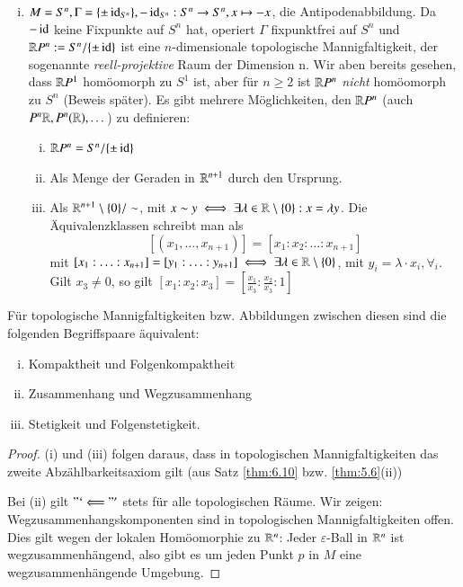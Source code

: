 \documentclass[a4paper,10pt]{scrartcl}
\newcommand{\eps}{\varepsilon}
\begin{document}
\begin{exs*}
 \begin{enumerate}[(i)]
  \item $M=S^n, \Gamma=\{\pm \operatorname{id}_{S^n}\}, -\operatorname{id}_{S^n}: S^n\to S^n, x\mapsto -x$, die Antipodenabbildung. Da $-\operatorname{id}$ keine Fixpunkte 
auf $S^n$ hat, operiert $\Gamma$ fixpunktfrei auf $S^n$ und $\mathbb{R} P^n := S^n/\{\pm \operatorname{id}\}$ ist eine $n$-dimensionale topologische Mannigfaltigkeit,
 der sogenannte \emph{reell-projektive} Raum der Dimension n. Wir aben bereits gesehen, dass $\mathbb{R} P^1$ homöomorph zu $S^1$ ist, aber für $n \geq 2$ ist $\mathbb{R} P^n$ \emph{nicht} homöomorph zu $S^n$ (Beweis später). Es gibt mehrere Möglichkeiten, den $\mathbb{R} P^n$ (auch $P^n \mathbb{R}, P^n(\mathbb{R}), \dotsc$) zu definieren:
\begin{enumerate}[(i)]
\item $\mathbb{R} P^n=S^n/\{\pm\operatorname{id}\}$ 
\item Als Menge der Geraden in $\mathbb{R}^{n+1}$ durch den Ursprung.
\item Als $\mathbb{R}^{n+1}\setminus \{0\}/\sim$, mit $x\sim y \iff \exists \lambda\in \mathbb{R}\setminus\{0\}: x=\lambda y$. Die Äquivalenzklassen schreibt man als 
\[
[(x_1,\dotsc,x_{n+1})]=[x_1:x_2:\dotsc: x_{n+1}] 
\]
mit $[x_1:\dotsc:x_{n+1}]=[y_1:\dotsc:y_{n+1}]\iff \exists \lambda\in \mathbb{R}\setminus\{0\}$, mit $y_i=\lambda\cdot x_i, \forall_i$.
Gilt $x_3\neq 0$, so gilt $[x_1:x_2:x_3]=[\frac{x_1}{x_3}:\frac{x_2}{x_3}:1]$\\
\fixme[fig34]
\end{enumerate}  
\end{enumerate}
\end{exs*}
\begin{st}
 Für topologische Mannigfaltigkeiten bzw. Abbildungen zwischen diesen sind die folgenden Begriffspaare äquivalent:
\begin{enumerate}[(i)]
 \item Kompaktheit und Folgenkompaktheit
 \item Zusammenhang und Wegzusammenhang
 \item Stetigkeit und Folgenstetigkeit.
\end{enumerate}
\end{st}
\fixme[fig35]
\begin{proof}
 (i) und (iii) folgen daraus, dass in topologischen Mannigfaltigkeiten das zweite Abzählbarkeitsaxiom gilt (aus Satz \ref{thm:6.10} bzw. \ref{thm:5.6}(ii))

Bei (ii) gilt $"`\Longleftarrow"'$ stets für alle topologischen Räume. Wir zeigen: Wegzusammenhangskomponenten sind in topologischen Mannigfaltigkeiten offen. Dies gilt wegen der lokalen Homöomorphie zu $\mathbb{R}^n$:
Jeder $\eps$-Ball in $\mathbb{R}^n$ ist wegzusammenhängend, also gibt es um jeden Punkt $p$ in $M$ eine wegzusammenhängende Umgebung.
\end{proof}
\end{document}
